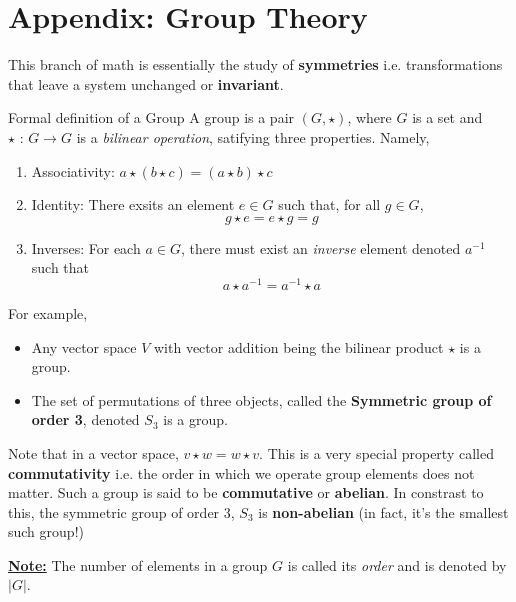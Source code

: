 \documentclass[11pt]{article}
\begin{document}
\newpage
\section{Appendix: Group Theory}


\vskip 0.5cm
This branch of math is essentially the study of \textbf{symmetries} i.e. transformations that leave a system unchanged or \textbf{invariant}.

\vskip 0.5cm
\begin{mathdefinitionbox}{Formal definition of a Group}
  \vskip 0.5cm
  A group is a pair $(G, \star)$, where $G$ is a set and $\star \text{ : } G \rightarrow G$ is a \emph{bilinear operation}, satifying three properties. Namely, 
  \begin{enumerate}[label=(\alph*)]
    \item Associativity: $a \star ( b \star c) = (a \star b) \star c$ 
    
    \item Identity: There exsits an element $e \in G$ such that, for all $g \in G$,
    \[ g \star e = e \star g = g \]

    \item Inverses: For each $a \in G$, there must exist an \emph{inverse} element denoted $a^{-1}$ such that 
    \[ a \star a^{-1} = a^{-1} \star a \]
  \end{enumerate}
\end{mathdefinitionbox}

\vskip 0.5cm
For example,
\begin{itemize}
  \item Any vector space $V$ with vector addition being the bilinear product $\star$ is a group.
  \item The set of permutations of three objects, called the \textbf{Symmetric group of order 3}, denoted $S_3$ is a group.
\end{itemize}

\vskip 0.5cm
Note that in a vector space, $v \star w = w \star v$. This is a very special property called \textbf{commutativity} i.e. the order in which we operate group elements does not matter. Such a group is said to be \textbf{commutative} or \textbf{abelian}. In constrast to this, the symmetric group of order 3, $S_3$ is \textbf{non-abelian} (in fact, it's the smallest such group!)

\vskip 0.5cm
\underline{\textbf{Note:}} The number of elements in a group $G$ is called its \emph{order} and is denoted by $\lvert G \rvert$.
\end{document}
